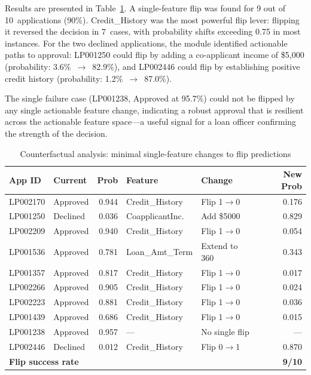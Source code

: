 \documentclass[lnbip]{svmultln}
\begin{document}
Results are presented in Table~\ref{tab:counterfactual}. A single-feature flip was found for 9 out of 10~applications (90\%). Credit\_History was the most powerful flip lever: flipping it reversed the decision in 7~cases, with probability shifts exceeding 0.75 in most instances. For the two declined applications, the module identified actionable paths to approval: LP001250 could flip by adding a co-applicant income of \$5,000 (probability: 3.6\%~$\to$~82.9\%), and LP002446 could flip by establishing positive credit history (probability: 1.2\%~$\to$~87.0\%).

The single failure case (LP001238, Approved at 95.7\%) could not be flipped by any single actionable feature change, indicating a robust approval that is resilient across the actionable feature space---a useful signal for a loan officer confirming the strength of the decision.

\begin{table}[htp]
    \centering
    \caption{Counterfactual analysis: minimal single-feature changes to flip predictions}
    \label{tab:counterfactual}
    \begin{tabular}{l l r l l r}
        \toprule
        \textbf{App ID} & \textbf{Current} & \textbf{Prob} & \textbf{Feature} & \textbf{Change} & \textbf{New Prob} \\
        \midrule
        LP002170 & Approved & 0.944 & Credit\_History & Flip 1$\to$0 & 0.176 \\
        LP001250 & Declined & 0.036 & CoapplicantInc. & Add \$5000 & 0.829 \\
        LP002209 & Approved & 0.940 & Credit\_History & Flip 1$\to$0 & 0.054 \\
        LP001536 & Approved & 0.781 & Loan\_Amt\_Term & Extend to 360 & 0.343 \\
        LP001357 & Approved & 0.817 & Credit\_History & Flip 1$\to$0 & 0.017 \\
        LP002266 & Approved & 0.905 & Credit\_History & Flip 1$\to$0 & 0.024 \\
        LP002223 & Approved & 0.881 & Credit\_History & Flip 1$\to$0 & 0.036 \\
        LP001439 & Approved & 0.686 & Credit\_History & Flip 1$\to$0 & 0.015 \\
        LP001238 & Approved & 0.957 & --- & No single flip & --- \\
        LP002446 & Declined & 0.012 & Credit\_History & Flip 0$\to$1 & 0.870 \\
        \midrule
        \multicolumn{5}{l}{\textbf{Flip success rate}} & \textbf{9/10} \\
        \bottomrule
    \end{tabular}
\end{table}
\end{document}

